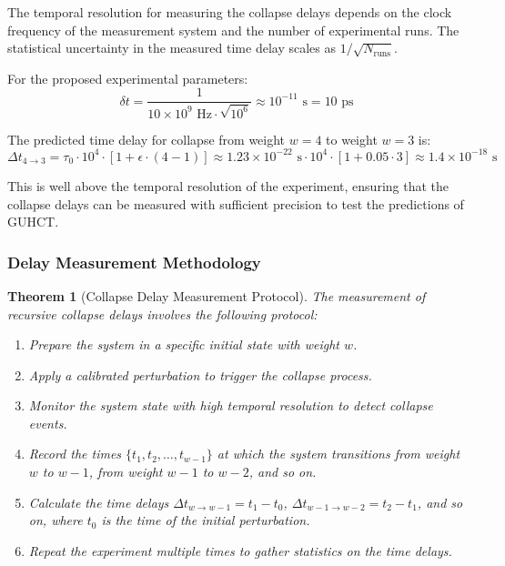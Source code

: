 \documentclass[11pt,a4paper]{article}
\makeatletter
\newtheorem{theorem}{Theorem}[section]
\renewenvironment{proof}[1][\proofname]{\par
  \pushQED{\qed}%
  \normalfont \topsep6\p@\@plus6\p@\relax
  \trivlist
  \item[\hskip\labelsep
        \itshape
    #1\@addpunct{.}]\ignorespaces
}{%
  \popQED\endtrivlist\@endpefalse
}
\makeatother
\begin{document}
\begin{proof}
The temporal resolution for measuring the collapse delays depends on the clock frequency of the measurement system and the number of experimental runs. The statistical uncertainty in the measured time delay scales as $1/\sqrt{N_{\text{runs}}}$.

For the proposed experimental parameters:
\begin{equation}
\delta t = \frac{1}{10 \times 10^9 \text{ Hz} \cdot \sqrt{10^6}} \approx 10^{-11} \text{ s} = 10 \text{ ps}
\end{equation}

The predicted time delay for collapse from weight $w=4$ to weight $w=3$ is:
\begin{equation}
\Delta t_{4 \to 3} = \tau_0 \cdot 10^4 \cdot [1 + \epsilon \cdot (4-1)] \approx 1.23 \times 10^{-22} \text{ s} \cdot 10^4 \cdot [1 + 0.05 \cdot 3] \approx 1.4 \times 10^{-18} \text{ s}
\end{equation}

This is well above the temporal resolution of the experiment, ensuring that the collapse delays can be measured with sufficient precision to test the predictions of GUHCT.
\end{proof}

\subsubsection{Delay Measurement Methodology}
\label{ssubsec:delay_measurement}

\begin{theorem}[Collapse Delay Measurement Protocol]
\label{thm:delay_protocol}
The measurement of recursive collapse delays involves the following protocol:
\begin{enumerate}
    \item Prepare the system in a specific initial state with weight $w$.
    \item Apply a calibrated perturbation to trigger the collapse process.
    \item Monitor the system state with high temporal resolution to detect collapse events.
    \item Record the times $\{t_1, t_2, \ldots, t_{w-1}\}$ at which the system transitions from weight $w$ to $w-1$, from weight $w-1$ to $w-2$, and so on.
    \item Calculate the time delays $\Delta t_{w \to w-1} = t_1 - t_0$, $\Delta t_{w-1 \to w-2} = t_2 - t_1$, and so on, where $t_0$ is the time of the initial perturbation.
    \item Repeat the experiment multiple times to gather statistics on the time delays.
\end{enumerate}
\end{theorem}
\end{document}
